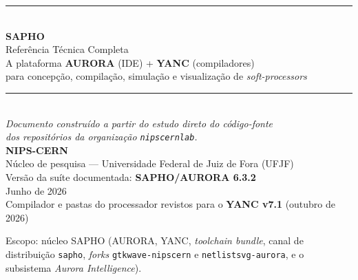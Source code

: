 \documentclass[11pt,a4paper,oneside]{report}
\begin{document}
\begin{titlepage}
\centering
\vspace*{2.5cm}
{\color{auroraTeal}\rule{\linewidth}{2pt}}\\[10pt]
{\Huge\bfseries\color{auroraDeep} SAPHO}\\[6pt]
{\LARGE\color{auroraInk} Referência Técnica Completa}\\[14pt]
{\large\color{auroraGray} A plataforma \textbf{AURORA} (IDE) + \textbf{YANC} (compiladores)\\
para concepção, compilação, simulação e visualização de \emph{soft-processors}}\\[10pt]
{\color{auroraTeal}\rule{\linewidth}{2pt}}\\[2cm]

{\large\itshape Documento construído a partir do estudo direto do código-fonte\\
dos repositórios da organização \texttt{nipscernlab}.}\\[2cm]

{\large\bfseries NIPS-CERN}\\[2pt]
{\normalsize Núcleo de pesquisa --- Universidade Federal de Juiz de Fora (UFJF)}\\[1.5cm]

{\normalsize Versão da suíte documentada: \textbf{SAPHO/AURORA 6.3.2}}\\[2pt]
{\normalsize Junho de 2026}\\[2pt]
{\normalsize Compilador e pastas do processador revistos para o \textbf{YANC v7.1} (outubro de 2026)}

\vfill
{\footnotesize\color{auroraGray} Escopo: núcleo SAPHO (AURORA, YANC, \textit{toolchain bundle},
canal de distribuição \texttt{sapho}, \textit{forks} \texttt{gtkwave-nipscern} e
\texttt{netlistsvg-aurora}, e o subsistema \textit{Aurora Intelligence}).\par}
\end{titlepage}

\cleardoublepage
\tableofcontents
\cleardoublepage




















\appendix


\end{document}
